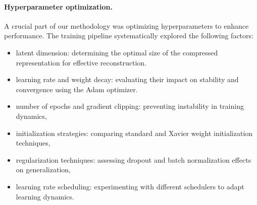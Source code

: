 \paragraph{Hyperparameter optimization.}
A crucial part of our methodology was optimizing hyperparameters to enhance performance. The training pipeline systematically explored the following factors:

\begin{itemize}
\item latent dimension: determining the optimal size of the compressed representation for effective reconstruction.
\item learning rate and weight decay: evaluating their impact on stability and convergence using the Adam optimizer.
\item number of epochs and gradient clipping: preventing instability in training dynamics,
\item initialization strategies: comparing standard and Xavier weight initialization techniques,
\item regularization techniques: assessing dropout and batch normalization effects on generalization,
\item learning rate scheduling: experimenting with different schedulers to adapt learning dynamics.
\end{itemize}
